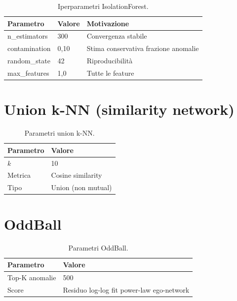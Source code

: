 \documentclass[12pt,a4paper]{report}
\begin{document}
\begin{table}[H]
\centering
\caption{Iperparametri IsolationForest.}
\begin{tabular}{@{}lp{4cm}p{5cm}@{}}
\toprule
Parametro & Valore & Motivazione \\
\midrule
n\_estimators & 300 & Convergenza stabile \\
contamination & 0,10 & Stima conservativa frazione anomalie \\
random\_state & 42 & Riproducibilità \\
max\_features & 1,0 & Tutte le feature \\
\bottomrule
\end{tabular}
\end{table}

\section{Union k-NN (similarity network)}

\begin{table}[H]
\centering
\caption{Parametri union k-NN.}
\begin{tabular}{@{}ll@{}}
\toprule
Parametro & Valore \\
\midrule
$k$ & 10 \\
Metrica & Cosine similarity \\
Tipo & Union (non mutual) \\
\bottomrule
\end{tabular}
\end{table}

\section{OddBall}

\begin{table}[H]
\centering
\caption{Parametri OddBall.}
\begin{tabular}{@{}ll@{}}
\toprule
Parametro & Valore \\
\midrule
Top-K anomalie & 500 \\
Score & Residuo log-log fit power-law ego-network \\
\bottomrule
\end{tabular}
\end{table}


\end{document}
